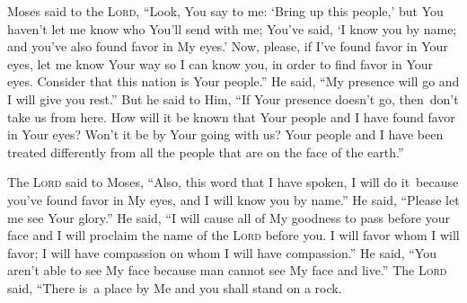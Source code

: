 \begin{inparaenum}
     Moses said to the \textsc{Lord}, ``Look, You say to me: `Bring up this people,' but You haven't let me know who You'll send with me; You've said, `I know you by name; and you've also found favor in My eyes.'%
     Now, please, if I've found favor in Your eyes, let me know Your way so I can know you, in order to find favor in Your eyes. Consider that this nation is Your people.''%
     He said, ``My presence will go and I will give you rest.''%
     But he said to Him, ``If Your presence doesn't go, then\understood\ don't take us from here.%
     How will it be known that Your people and I have found favor in Your eyes? Won't it be by Your going with us? Your people and I have been treated differently from all the people that are on the face of the earth.''%
    
     The \textsc{Lord} said to Moses, ``Also, this word that I have spoken, I will do it\understood\ because you've found favor in My eyes, and I will know you by name.''%
     He said, ``Please let me see Your glory.''%
     He said, ``I will cause all of My goodness to pass before your face and I will proclaim the name of the \textsc{Lord} before you. I will favor whom I will favor; I will have compassion on whom I will have compassion.''%
     He said, ``You aren't able to see My face because man cannot see My face and live.''%
     The \textsc{Lord} said, ``There is\understood\ a place by Me and you shall stand on a rock.%
\end{inparaenum}
